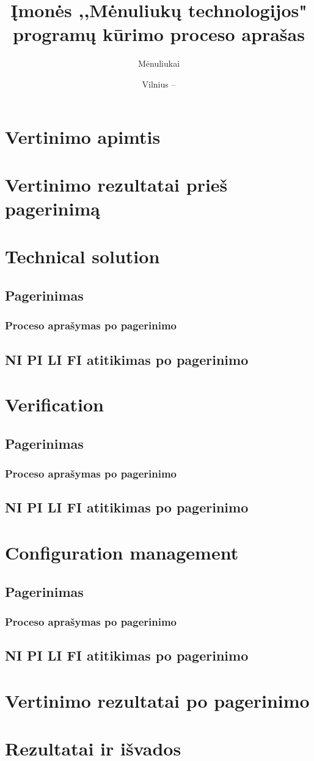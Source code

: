 \documentclass{VUMIFPSkursinis}
\title{Įmonės ,,Mėnuliukų technologijos" programų kūrimo proceso aprašas}
\author{Mėnuliukai}
\date{Vilnius – \the\year}
\begin{document}
\maketitle

\tableofcontents
	\section{Vertinimo apimtis}
	\section{Vertinimo rezultatai prieš pagerinimą}
	\section{Technical solution}
		\subsection{Pagerinimas}
			\subsubsection{Proceso aprašymas po pagerinimo}
		\subsection{NI PI LI FI atitikimas po pagerinimo}
	\section{Verification}
		\subsection{Pagerinimas}
			\subsubsection{Proceso aprašymas po pagerinimo}
		\subsection{NI PI LI FI atitikimas po pagerinimo}
	\section{Configuration management}
		\subsection{Pagerinimas}
			\subsubsection{Proceso aprašymas po pagerinimo}
		\subsection{NI PI LI FI atitikimas po pagerinimo}
	\section{Vertinimo rezultatai po pagerinimo}
	\section{Rezultatai ir išvados}
\end{document}
